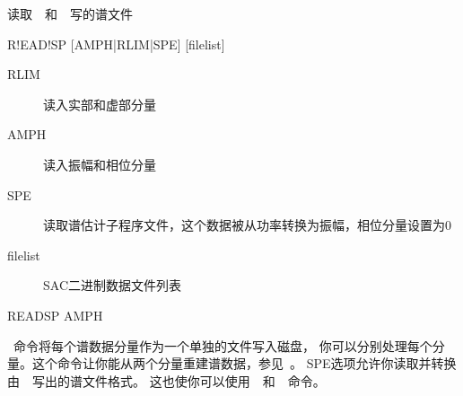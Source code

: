 \label{cmd:readsp}

读取~~和~~写的谱文件

\begin{SACSTX}
R!EAD!SP [AMPH|RLIM|SPE] [filelist]
\end{SACSTX}

\begin{description}
\item [RLIM]  读入实部和虚部分量
\item [AMPH]  读入振幅和相位分量
\item [SPE] 读取谱估计子程序文件，这个数据被从功率转换为振幅，相位分量设置为0
\item [filelist] SAC二进制数据文件列表
\end{description}

\begin{SACDFT}
READSP AMPH
\end{SACDFT}

~命令将每个谱数据分量作为一个单独的文件写入磁盘，
你可以分别处理每个分量。这个命令让你能从两个分量重建谱数据，参见~。
SPE选项允许你读取并转换由~~写出的谱文件格式。
这也使你可以使用~~和~~命令。

